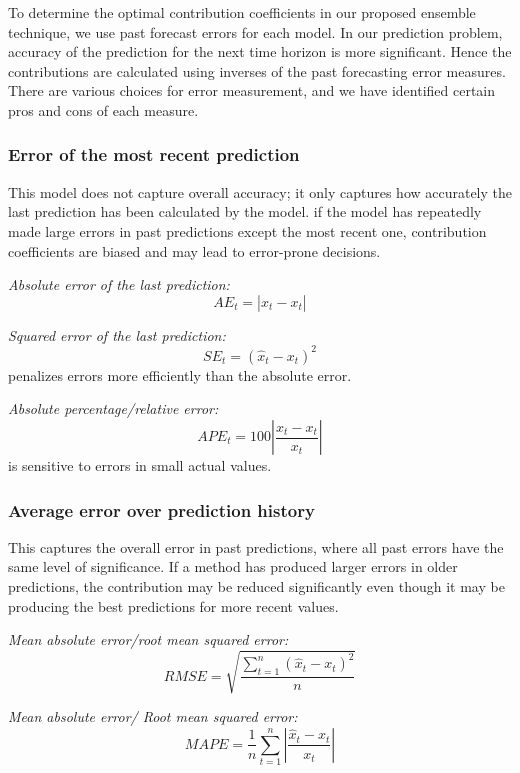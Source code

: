 To determine the optimal contribution coefficients in our proposed ensemble technique, we use past forecast errors for each model. In our prediction problem, accuracy of the prediction for the next time horizon is more significant. Hence the contributions are calculated using inverses of the past forecasting error measures. There are various choices for error measurement, and we have identified certain pros and cons of each measure.

\subsubsection{Error of the most recent prediction}

This model does not capture overall accuracy; it only captures how accurately the last prediction has been calculated by the model. if the model has repeatedly made large errors in past predictions except the most recent one, contribution coefficients are biased and may lead to error-prone decisions.

\textit{Absolute error of the last prediction:}
$$AE_t=|\hat{x}_t-x_t|$$

\textit{Squared error of the last prediction:}
$$SE_t=(\hat{x}_t-x_t)^2$$
penalizes errors more efficiently than the absolute error.

\textit{Absolute percentage/relative error:}
$$APE_t=100\left |\frac{\hat{x}_t-x_t}{x_t}  \right |$$
is sensitive to errors in small actual values.

\subsubsection{Average error over prediction history}
This captures the overall error in past predictions, where all past errors have the same level of significance. If a method has produced larger errors in older predictions, the contribution may be reduced significantly even though it may be producing the best predictions for more recent values.

\textit{Mean absolute error/root mean squared error:}
$$RMSE=\sqrt{\frac{\sum_{t=1}^{n}(\hat{x}_{t}-x_{t})^{2}}{n}}$$ 

\textit{Mean absolute error/ Root mean squared error:}
$$MAPE=\frac{1}{n}\sum_{t=1}^{n}\left | \frac{\hat{x}_{t}-x_{t}}{x_{t}} \right |$$

